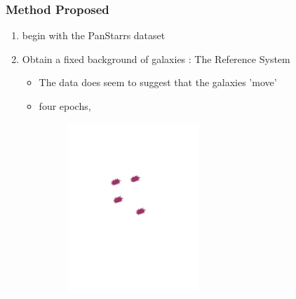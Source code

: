 \documentclass[10pt, compress]{beamer}
\begin{document}
\begin{frame}
\frametitle{Method Proposed}
	\begin{enumerate}
		\item<1-> begin with  the PanStarrs dataset
        \item<2-> Obtain a fixed background of galaxies : The Reference System
        	\begin{itemize}
				\item<3-> The data does seem to suggest that the galaxies 'move'
                \item<4-> four epochs, \begin{figure}\includegraphics[width=0.5\textwidth]{1.jpg}
                \end{figure}          
            \end{itemize}
      \end{enumerate}      
				
\end{frame}             
                
\end{document}
